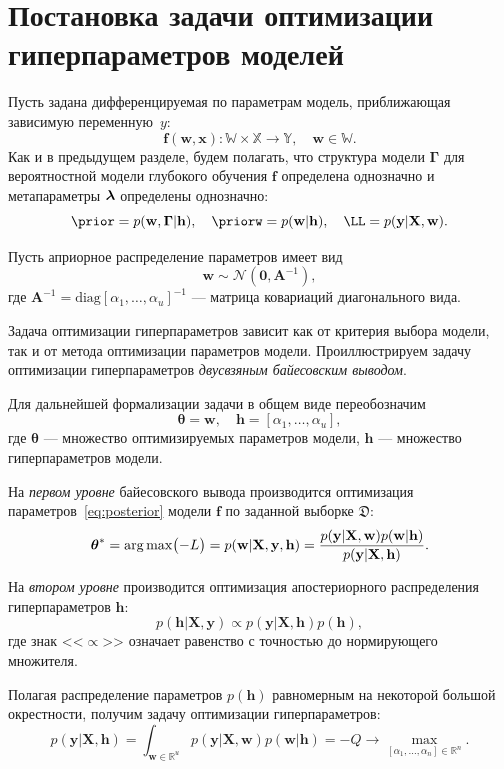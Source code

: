 \section{Постановка задачи оптимизации гиперпараметров моделей}
Пусть задана дифференцируемая по параметрам модель, приближающая зависимую переменную~$y$:
\[
	\mathbf{f}(\mathbf{w}, \mathbf{x}):\mathbb{W} \times \mathbb{X} \to \mathbb{Y}, \quad \mathbf{w} \in \mathbb{W}.
\]
Как и в предыдущем разделе, будем полагать, что структура модели $\boldsymbol{\Gamma}$ для вероятностной модели глубокого обучения $\mathbf{f}$ определена однозначно и метапараметры $\boldsymbol{\lambda}$ определены однозначно:
\[
    \prior = p(\w,\G|\h), \quad \priorw = p(\w|\h),\quad    \LL = p(\y|\X,\w).
\]

Пусть априорное распределение параметров имеет вид
\begin{equation}
\label{eq:prior}
	\mathbf{w} \sim \mathcal{N}(\mathbf{0}, \mathbf{A}^{-1}),
\end{equation}
где $\mathbf{A}^{-1} = \text{diag}[\alpha_1, \dots, \alpha_u]^{-1}$ --- матрица ковариаций диагонального вида.


Задача оптимизации гиперпараметров зависит как от критерия выбора модели, так и от метода оптимизации параметров модели.
Проиллюстрируем задачу оптимизации гиперпараметров \textit{двусвзяным байесовским выводом}.

\begin{example}
Для дальнейшей формализации задачи в общем виде переобозначим
\begin{equation}
\label{eq:bayes0}
	\boldsymbol{\theta} = \mathbf{w}, \quad \mathbf{h} = [\alpha_1, \dots, \alpha_u],	
\end{equation}
где $\boldsymbol{\theta}$ --- множество оптимизируемых параметров модели, $\mathbf{h}$ --- множество гиперпараметров модели.

На \textit{первом уровне} байесовского вывода производится оптимизация параметров~\eqref{eq:posterior} модели $\mathbf{f}$ по заданной выборке $\mathfrak{D}$:
\begin{equation}
\label{eq:bayes1}
{\boldsymbol{\theta}}^{*} = \operatorname*{arg\,max} \bigl(-L\bigr) = p(\mathbf{w}|\mathbf{X}, \mathbf{y}, \mathbf{h}) = \frac{p(\mathbf{y}|\mathbf{X},\mathbf{w})p(\mathbf{w}|\mathbf{h})}{p(\mathbf{y}|\mathbf{X},\mathbf{h})}.
\end{equation}

На \textit{втором уровне} производится оптимизация апостериорного распределения гиперпараметров $\mathbf{h}$:
\[
p(\mathbf{h}|\mathbf{X}, \mathbf{y}) \propto p(\mathbf{y}|\mathbf{X},\mathbf{h})p(\mathbf{h}),
\]
где знак <<$\propto$>> означает равенство с точностью до нормирующего множителя.

Полагая распределение параметров $p(\mathbf{h})$ равномерным на некоторой большой окрестности, получим задачу оптимизации гиперпараметров:
\begin{equation}
\label{eq:bayes2}
	p(\mathbf{y}|\mathbf{X},\mathbf{h}) = \int_{\mathbf{w} \in \mathbb{R}^u} p(\mathbf{y}|\mathbf{X}, \mathbf{w}) p(\mathbf{w}|\mathbf{h}) = -Q \to \max_{[\alpha_1, \dots, \alpha_n] \in \mathbb{R}^{n}}.
\end{equation}
\end{example}

